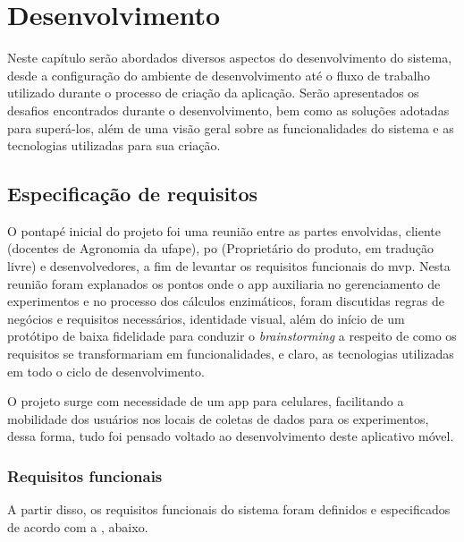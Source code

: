 \chapter{Desenvolvimento}
Neste capítulo serão abordados diversos aspectos do desenvolvimento do sistema, desde a configuração do ambiente de desenvolvimento até o fluxo de trabalho utilizado durante o processo de criação da aplicação. Serão apresentados os desafios encontrados durante o desenvolvimento, bem como as soluções adotadas para superá-los, além de uma visão geral sobre as funcionalidades do sistema e as tecnologias utilizadas para sua criação.

\section{Especificação de requisitos}\label{sec:especificacao_de_requisitos}
O pontapé inicial do projeto foi uma reunião entre as partes envolvidas, cliente (docentes de Agronomia da \ac{ufape}), \ac{po} (Proprietário do produto, em tradução livre) e desenvolvedores, a fim de levantar os requisitos funcionais do \ac{mvp}. Nesta reunião foram explanados os pontos onde o \ac{app} auxiliaria no gerenciamento de experimentos e no processo dos cálculos enzimáticos, foram discutidas regras de negócios e requisitos necessários, identidade visual, além do início de um protótipo de baixa fidelidade para conduzir o \textit{brainstorming} a respeito de como os requisitos se transformariam em funcionalidades, e claro, as tecnologias utilizadas em todo o ciclo de desenvolvimento.

O projeto surge com necessidade de um \ac{app} para celulares, facilitando a mobilidade dos usuários nos locais de coletas de dados para os experimentos, dessa forma, tudo foi pensado voltado ao desenvolvimento deste aplicativo móvel.

\subsection{Requisitos funcionais}\label{ssec:requisitos_funcionais}
A partir disso, os requisitos funcionais do sistema foram definidos e especificados de acordo com a , abaixo.


